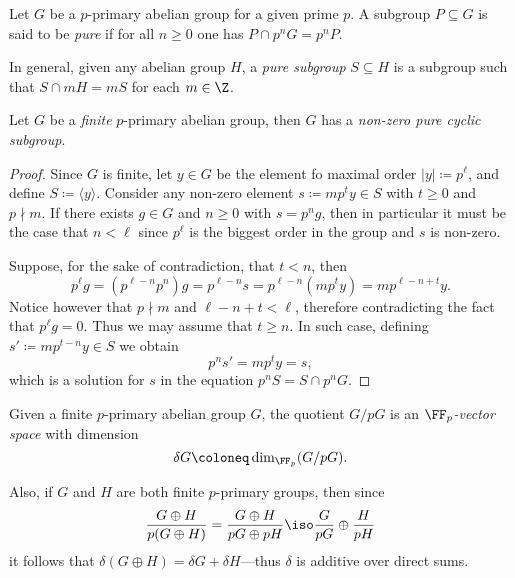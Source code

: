 \begin{definition}
    \label{def:pure-subgroup}
    Let \(G\) be a \(p\)-primary abelian group for a given prime \(p\). A subgroup
    \(P \subseteq G\) is said to be \emph{pure} if for all \(n \geq 0\) one has
    \(P \cap p^n G = p^n P\).

    In general, given any abelian group \(H\), a \emph{pure subgroup}
    \(S \subseteq H\) is a subgroup such that \(S \cap m H = m S\) for each
    \(m \in \Z\).
\end{definition}

\begin{lemma}
    \label{lem:finite-p-primary-has-pure-cyclic-subgrp}
    Let \(G\) be a \emph{finite} \(p\)-primary abelian group, then \(G\) has a
    \emph{non-zero pure cyclic subgroup}.
\end{lemma}

\begin{proof}
    Since \(G\) is finite, let \(y \in G\) be the element fo maximal order
    \(|y| \coloneq p^{\ell}\), and define \(S \coloneq \langle y \rangle\). Consider
    any non-zero element \(s \coloneq m p^t y \in S\) with \(t \geq 0\) and
    \(p \nmid m\). If there exists \(g \in G\) and \(n \geq 0\) with \(s = p^n g\),
    then in particular it must be the case that \(n < \ell\) since \(p^{\ell}\) is
    the biggest order in the group and \(s\) is non-zero.

    Suppose, for the sake of contradiction, that \(t < n\), then
    \[
        p^\ell g = (p^{\ell - n} p^n) g = p^{\ell - n} s = p^{\ell - n} (m p^t y) = m
        p^{\ell - n + t} y.
    \]
    Notice however that \(p \nmid m\) and \(\ell - n + t < \ell\), therefore
    contradicting the fact that \(p^{\ell} g = 0\). Thus we may assume that
    \(t \geq n\). In such case, defining \(s' \coloneq m p^{t-n} y \in S\) we obtain
    \[
        p^n s' = m p^t y = s,
    \]
    which is a solution for \(s\) in the equation \(p^n S = S \cap p^n G\).
\end{proof}

\begin{definition}
    \label{def:finite-p-primary-quotiented-is-Fp-vector-space}
    Given a finite \(p\)-primary abelian group \(G\), the quotient \(G/pG\) is an
    \emph{\(\FF_p\)-vector space} with dimension
    \[
        \delta G \coloneq \dim_{\FF_p}(G/pG).
    \]
\end{definition}

Also, if \(G\) and \(H\) are both finite \(p\)-primary groups, then since
\[
    \frac{G \oplus H}{p(G \oplus H)} = \frac{G \oplus H}{p G \oplus p H}
    \iso \frac{G}{p G} \oplus \frac{H}{p H}
\]
it follows that \(\delta(G \oplus H) = \delta G + \delta H\)---thus \(\delta\)
is additive over direct sums.

